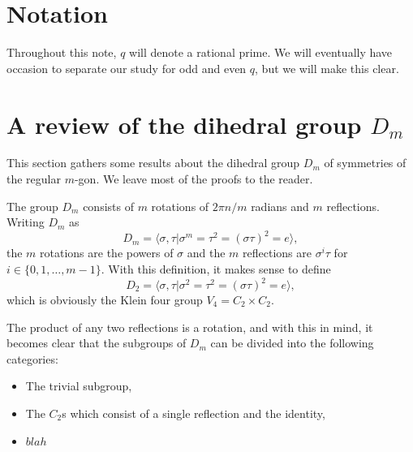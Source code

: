 \documentclass[11pt]{article}
\theoremstyle{definition}
\begin{document}
\section*{Notation}

Throughout this note, $q$ will denote a rational prime. We will eventually have
occasion to separate our study for odd and even $q$, but we will make this clear.

\section{A review of the dihedral group $D_m$}

This section gathers some results about the dihedral group $D_m$ of symmetries
of the regular $m$-gon.  We leave most of the proofs to the reader.

The group $D_m$ consists of $m$ rotations of $2\pi n/m$ radians and $m$ reflections.
Writing $D_m$ as
\[ D_m = \langle \sigma, \tau | \sigma^m = \tau^2 = (\sigma\tau)^2 = e \rangle , \]
the $m$ rotations are the powers of $\sigma$ and the $m$ reflections are $\sigma^i\tau$
for $i \in \{0, 1, \ldots, m-1\}$. With this definition, it makes sense to define
\[ D_2 = \langle \sigma, \tau | \sigma^2 = \tau^2 = (\sigma\tau)^2 = e \rangle , \]
which is obviously the Klein four group $V_4 = C_2 \times C_2$.

The product of any two reflections is a rotation, and with this in mind, it becomes clear
that the subgroups of $D_m$ can be divided into the following categories:
\begin{itemize}
  \item The trivial subgroup,
  \item The $C_2$s which consist of a single reflection and the identity,
  \item $blah$
\end{itemize}




{}

\end{document}
